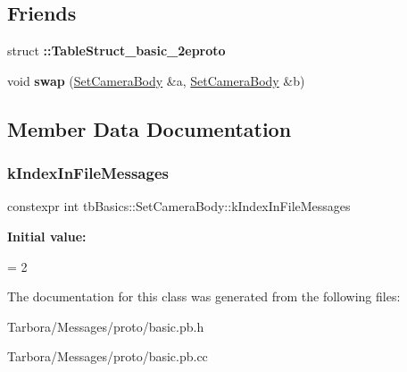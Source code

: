 \subsection*{Friends}
\begin{DoxyCompactItemize}
\item 
\mbox{\label{classtbBasics_1_1SetCameraBody_ae86a2f4c520666b65d606ccbe2122e61}} 
struct {\bfseries \+::\+Table\+Struct\+\_\+basic\+\_\+2eproto}
\item 
\mbox{\label{classtbBasics_1_1SetCameraBody_ab1391f39ef9208cb1a54df0e57dc8478}} 
void {\bfseries swap} (\hyperlink{classtbBasics_1_1SetCameraBody}{Set\+Camera\+Body} \&a, \hyperlink{classtbBasics_1_1SetCameraBody}{Set\+Camera\+Body} \&b)
\end{DoxyCompactItemize}


\subsection{Member Data Documentation}
\mbox{\label{classtbBasics_1_1SetCameraBody_a72e3ee7b4e24bcc93df8d43d82526203}} 
\subsubsection{\texorpdfstring{k\+Index\+In\+File\+Messages}{kIndexInFileMessages}}
{\footnotesize\ttfamily constexpr int tb\+Basics\+::\+Set\+Camera\+Body\+::k\+Index\+In\+File\+Messages\hspace{0.3cm}{\ttfamily [static]}}

{\bfseries Initial value\+:}
\begin{DoxyCode}
=
    2
\end{DoxyCode}


The documentation for this class was generated from the following files\+:\begin{DoxyCompactItemize}
\item 
Tarbora/\+Messages/proto/basic.\+pb.\+h\item 
Tarbora/\+Messages/proto/basic.\+pb.\+cc\end{DoxyCompactItemize}
